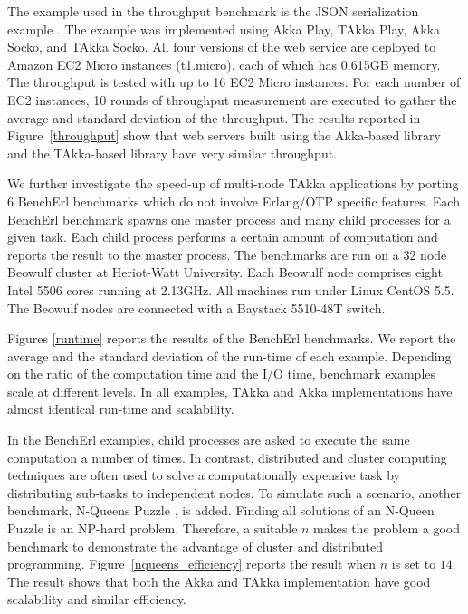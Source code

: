 The example used in the throughput benchmark is the JSON serialization example 
\citep{techempower}.  The example was implemented using Akka Play, TAkka Play, Akka 
Socko, and TAkka Socko.  All four versions of the web service are deployed to 
Amazon EC2 Micro instances (t1.micro), each of which has 0.615GB memory. The throughput 
is tested with up to 16 EC2 Micro instances.  For each number of EC2 instances, 
10 rounds of throughput measurement are executed to gather the average and 
standard deviation of the throughput. The results reported in Figure~\ref{throughput} show that web servers built using the Akka-based library and 
the TAkka-based library have very similar throughput.


We further investigate the speed-up of multi-node TAkka applications by 
porting 6  BenchErl benchmarks \citep{RELEASE} which do not involve Erlang/OTP 
specific features.  Each BenchErl benchmark spawns one master process and 
many child processes for a given task.  Each child process performs 
a certain amount of computation and reports the result to the master process.  
The benchmarks are run on a 32 node Beowulf cluster at Heriot-Watt 
University. Each Beowulf node comprises eight Intel 5506 cores running at
2.13GHz. All machines run under Linux CentOS 5.5. The Beowulf nodes are
connected with a Baystack 5510-48T switch.

Figures \ref{runtime} reports the results of the BenchErl 
benchmarks.   We report the average and the standard deviation 
of the run-time of each example.  Depending on the ratio of the computation 
time and the I/O time, benchmark examples scale at different levels.  In 
all examples, TAkka and Akka implementations have almost identical 
run-time and scalability.

In the BenchErl examples, child processes are asked to 
execute the same computation a number of times.  In contrast, distributed and 
cluster computing techniques are often used to solve a computationally 
expensive task by distributing sub-tasks to independent nodes.  To simulate 
such a scenario, another benchmark, N-Queens Puzzle \citep{wiki:nqueens}, is added. 
Finding all solutions of an N-Queen Puzzle is an NP-hard problem.  Therefore, a 
suitable $n$ makes the problem a good benchmark to demonstrate the advantage of 
cluster and distributed programming.  Figure~\ref{nqueens_efficiency}
reports the result when $n$ is set to $14$.  The result shows that both the Akka and 
TAkka implementation have good scalability and similar efficiency.



